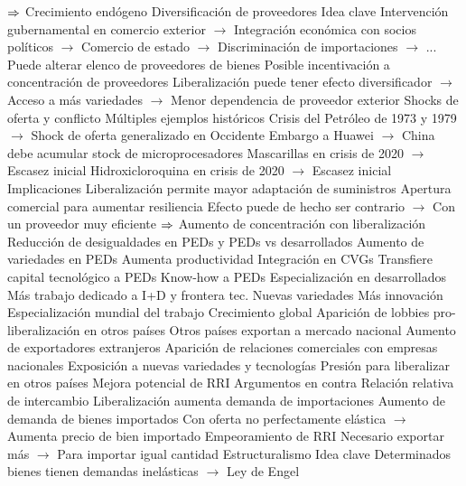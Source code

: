 \documentclass{nuevotema}
\begin{document}
\begin{esquemal}
				\4[] $\then$ Crecimiento endógeno
			\3 Diversificación de proveedores
				\4 Idea clave
				\4[] Intervención gubernamental en comercio exterior
				\4[] $\to$ Integración económica con socios políticos
				\4[] $\to$ Comercio de estado
				\4[] $\to$ Discriminación de importaciones
				\4[] $\to$ ...
				\4[] Puede alterar elenco de proveedores de bienes
				\4[] Posible incentivación a concentración de proveedores
				\4[] Liberalización puede tener efecto diversificador
				\4[] $\to$ Acceso a más variedades
				\4[] $\to$ Menor dependencia de proveedor exterior
				\4 Shocks de oferta y conflicto
				\4[] Múltiples ejemplos históricos
				\4[] Crisis del Petróleo de 1973 y 1979
				\4[] $\to$ Shock de oferta generalizado en Occidente
				\4[] Embargo a Huawei
				\4[] $\to$ China debe acumular stock de microprocesadores
				\4[] Mascarillas en crisis de 2020
				\4[] $\to$ Escasez inicial
				\4[] Hidroxicloroquina en crisis de 2020
				\4[] $\to$ Escasez inicial
				\4 Implicaciones
				\4[] Liberalización permite mayor adaptación de suministros
				\4[] Apertura comercial para aumentar resiliencia
				\4[] Efecto puede de hecho ser contrario
				\4[] $\to$ Con un proveedor muy eficiente
				\4[] $\then$  Aumento de concentración con liberalización
			\3 Reducción de desigualdades en PEDs y PEDs vs desarrollados
				\4 Aumento de variedades en PEDs
				\4[] Aumenta productividad
				\4 Integración en CVGs
				\4[] Transfiere capital tecnológico a PEDs
				\4[] Know-how a PEDs
				\4 Especialización en desarrollados
				\4[] Más trabajo dedicado a I+D y frontera tec.
				\4[] Nuevas variedades
				\4[] Más innovación
				\4[$\then$] Especialización mundial del trabajo
				\4[$\then$] Crecimiento global
			\3 Aparición de lobbies pro-liberalización en otros países
				\4 Otros países exportan a mercado nacional
				\4[] Aumento de exportadores extranjeros
				\4 Aparición de relaciones comerciales con empresas nacionales
				\4 Exposición a nuevas variedades y tecnologías
				\4 Presión para liberalizar en otros países
				\4[$\then$] Mejora potencial de RRI
		\2 Argumentos en contra
			\3 Relación relativa de intercambio
				\4 Liberalización aumenta demanda de importaciones
				\4 Aumento de demanda de bienes importados
				\4[] Con oferta no perfectamente elástica
				\4[] $\to$ Aumenta precio de bien importado
				\4[$\then$] Empeoramiento de RRI
				\4[] Necesario exportar más
				\4[] $\to$ Para importar igual cantidad
			\3 Estructuralismo
				\4 Idea clave
				\4[] Determinados bienes tienen demandas inelásticas
				\4[] $\to$ Ley de Engel

\end{esquemal}
\end{document}
